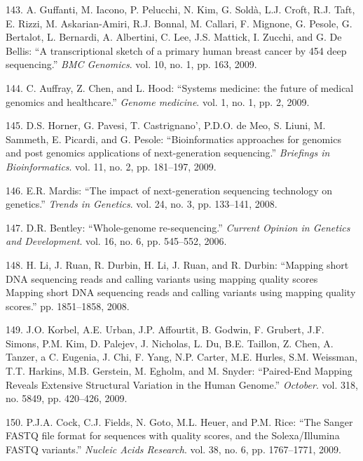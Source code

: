 \documentclass[12pt,a4paper,twoside]{ugathesis}
\theoremstyle{definition}
\theoremstyle{definition}
\theoremstyle{definition}
\theoremstyle{remark}
\begin{document}
\hypertarget{ref-Guffanti2009}{}
143. A. Guffanti, M. Iacono, P. Pelucchi, N. Kim, G. Soldà, L.J. Croft,
R.J. Taft, E. Rizzi, M. Askarian-Amiri, R.J. Bonnal, M. Callari, F.
Mignone, G. Pesole, G. Bertalot, L. Bernardi, A. Albertini, C. Lee, J.S.
Mattick, I. Zucchi, and G. De Bellis: ``A transcriptional sketch of a
primary human breast cancer by 454 deep sequencing.'' \emph{BMC
Genomics}. vol. 10, no. 1, pp. 163, 2009.

\hypertarget{ref-Auffray2009}{}
144. C. Auffray, Z. Chen, and L. Hood: ``Systems medicine: the future of
medical genomics and healthcare.'' \emph{Genome medicine}. vol. 1, no.
1, pp. 2, 2009.

\hypertarget{ref-Horner2009}{}
145. D.S. Horner, G. Pavesi, T. Castrignano', P.D.O. de Meo, S. Liuni,
M. Sammeth, E. Picardi, and G. Pesole: ``Bioinformatics approaches for
genomics and post genomics applications of next-generation sequencing.''
\emph{Briefings in Bioinformatics}. vol. 11, no. 2, pp. 181--197, 2009.

\hypertarget{ref-Mardis2008}{}
146. E.R. Mardis: ``The impact of next-generation sequencing technology
on genetics.'' \emph{Trends in Genetics}. vol. 24, no. 3, pp. 133--141,
2008.

\hypertarget{ref-Bentley2006}{}
147. D.R. Bentley: ``Whole-genome re-sequencing.'' \emph{Current Opinion
in Genetics and Development}. vol. 16, no. 6, pp. 545--552, 2006.

\hypertarget{ref-Li2008}{}
148. H. Li, J. Ruan, R. Durbin, H. Li, J. Ruan, and R. Durbin: ``Mapping
short DNA sequencing reads and calling variants using mapping quality
scores Mapping short DNA sequencing reads and calling variants using
mapping quality scores.'' pp. 1851--1858, 2008.

\hypertarget{ref-Korbel2009}{}
149. J.O. Korbel, A.E. Urban, J.P. Affourtit, B. Godwin, F. Grubert,
J.F. Simons, P.M. Kim, D. Palejev, J. Nicholas, L. Du, B.E. Taillon, Z.
Chen, A. Tanzer, a C. Eugenia, J. Chi, F. Yang, N.P. Carter, M.E.
Hurles, S.M. Weissman, T.T. Harkins, M.B. Gerstein, M. Egholm, and M.
Snyder: ``Paired-End Mapping Reveals Extensive Structural Variation in
the Human Genome.'' \emph{October}. vol. 318, no. 5849, pp. 420--426,
2009.

\hypertarget{ref-Cock2009}{}
150. P.J.A. Cock, C.J. Fields, N. Goto, M.L. Heuer, and P.M. Rice: ``The
Sanger FASTQ file format for sequences with quality scores, and the
Solexa/Illumina FASTQ variants.'' \emph{Nucleic Acids Research}. vol.
38, no. 6, pp. 1767--1771, 2009.
\end{document}

